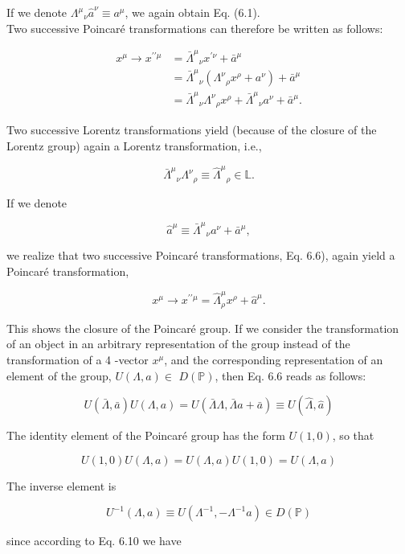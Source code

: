 \documentclass[10pt, letterpaper]{article}
\begin{document}
If we denote $\Lambda^{\mu}{ }_{\nu} \hat{a}^{\nu} \equiv a^{\mu}$, we again obtain Eq. (6.1).\\
Two successive Poincaré transformations can therefore be written as follows:

$$
\begin{aligned}
x^{\mu} \longrightarrow x^{\prime \prime \mu} & =\bar{\Lambda}^{\mu}{ }_{\nu} x^{\prime \nu}+\bar{a}^{\mu} \\
& =\bar{\Lambda}^{\mu}{ }_{\nu}\left(\Lambda^{\nu}{ }_{\rho} x^{\rho}+a^{\nu}\right)+\bar{a}^{\mu} \\
& =\bar{\Lambda}^{\mu}{ }_{\nu} \Lambda^{\nu}{ }_{\rho} x^{\rho}+\bar{\Lambda}^{\mu}{ }_{\nu} a^{\nu}+\bar{a}^{\mu} .
\end{aligned}
$$

Two successive Lorentz transformations yield (because of the closure of the Lorentz group) again a Lorentz transformation, i.e.,

$$
\bar{\Lambda}^{\mu}{ }_{\nu} \Lambda^{\nu}{ }_{\rho} \equiv \hat{\Lambda}^{\mu}{ }_{\rho} \in \mathbb{L} .
$$

If we denote

$$
\hat{a}^{\mu} \equiv \bar{\Lambda}^{\mu}{ }_{\nu} a^{\nu}+\bar{a}^{\mu},
$$

we realize that two successive Poincaré transformations, Eq. 6.6), again yield a Poincaré transformation,

$$
x^{\mu} \longrightarrow x^{\prime \prime \mu}=\hat{\Lambda}_{\rho}^{\mu} x^{\rho}+\hat{a}^{\mu} .
$$

This shows the closure of the Poincaré group. If we consider the transformation of an object in an arbitrary representation of the group instead of the transformation of a 4 -vector $x^{\mu}$, and the corresponding representation of an element of the group, $U(\Lambda, a) \in$ $D(\mathbb{P})$, then Eq. 6.6 reads as follows:

$$
U(\bar{\Lambda}, \bar{a}) U(\Lambda, a)=U(\bar{\Lambda} \Lambda, \bar{\Lambda} a+\bar{a}) \equiv U(\hat{\Lambda}, \hat{a})
$$

The identity element of the Poincaré group has the form $U(1,0)$, so that

$$
U(1,0) U(\Lambda, a)=U(\Lambda, a) U(1,0)=U(\Lambda, a)
$$

The inverse element is

$$
U^{-1}(\Lambda, a) \equiv U\left(\Lambda^{-1},-\Lambda^{-1} a\right) \in D(\mathbb{P})
$$

since according to Eq. 6.10 we have
\end{document}
